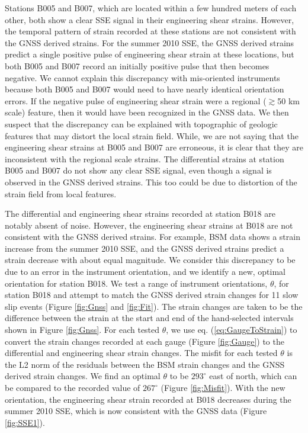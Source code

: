 \documentclass[10pt,a4paper]{article}
\begin{document}
Stations B005 and B007, which are located within a few hundred meters of each other, both show a clear SSE signal in their engineering shear strains.  However, the temporal pattern of strain recorded at these stations are not consistent with the GNSS derived strains.  For the summer 2010 SSE, the GNSS derived strains predict a single positive pulse of engineering shear strain at these locations, but both B005 and B007 record an initially positive pulse that then becomes negative. We cannot explain this discrepancy with mis-oriented instruments because both B005 and B007 would need to have nearly identical orientation errors. If the negative pulse of engineering shear strain were a regional ($\gtrsim$50 km scale) feature, then it would have been recognized in the GNSS data. We then suspect that the discrepancy can be explained with topographic of geologic features that may distort the local strain field. While, we are not saying that the engineering shear strains at B005 and B007 are erroneous, it is clear that they are inconsistent with the regional scale strains. The differential strains at station B005 and B007 do not show any clear SSE signal, even though a signal is observed in the GNSS derived strains. This too could be due to distortion of the strain field from local features.

The differential and engineering shear strains recorded at station B018 are notably absent of noise. However, the engineering shear strains at B018 are not consistent with the GNSS derived strains. For example, BSM data shows a strain increase from the summer 2010 SSE, and the GNSS derived strains predict a strain decrease with about equal magnitude. We consider this discrepancy to be due to an error in the instrument orientation, and we identify a new, optimal orientation for station B018. We test a range of instrument orientations, $\theta$, for station B018 and attempt to match the GNSS derived strain changes for 11 slow slip events (Figure \ref{fig:Gnss} and \ref{fig:Fit}). The strain changes are taken to be the difference between the strain at the start and end of the hand-selected intervals shown in Figure \ref{fig:Gnss}. For each tested $\theta$, we use eq. (\ref{eq:GaugeToStrain}) to convert the strain changes recorded at each gauge (Figure \ref{fig:Gauge}) to the differential and engineering shear strain changes. The misfit for each tested $\theta$ is the L2 norm of the residuals between the BSM strain changes and the GNSS derived strain changes. We find an optimal $\theta$ to be $293^\circ$ east of north, which can be compared to the recorded value of $267^\circ$ (Figure \ref{fig:Misfit}). With the new orientation, the engineering shear strain recorded at B018 decreases during the summer 2010 SSE, which is now consistent with the GNSS data (Figure \ref{fig:SSE1}).           
\end{document}

